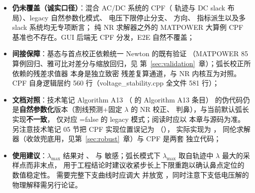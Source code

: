 \begin{itemize}
\begin{enumerate}
        \end{enumerate}
        同批新增的高级求解器回归还有
         与
        （ctest 目标 \texttt{test\_homotopy\_continuation} 与
        \texttt{test\_newton\_krylov}，），第~\ref{sec:robust}~章
        所述同伦求解器与 Newton--Krylov 的“无专项回归”状态同步解除；
  \item \textbf{仍未覆盖（诚实口径）}：混合 AC/DC 系统的 CPF（
        轨迹与 DC slack 布局）、legacy 自然参数化模式、
         电压下限停止分支、 方向、
         指标派生以及多 slack 系统均无专项断言；
        纯 NR 求解器之外的 MATPOWER 大算例 CPF 基准也不存在。GUI 后端无
        CPF 分发，E2E 自然不覆盖；
  \item \textbf{间接保障}：基态与首点校正依赖统一 Newton 的既有验证
        （MATPOWER 85 算例回归、雅可比对差分与缩放回归，见
        第~\ref{sec:validation}~章）；弧长校正所依赖的残差求值器
         本身是独立致密
        残差复算通道，与 NR 内核互为对照。CPF 自身逻辑层约
        560 行（voltage\_stability.cpp 全文件 581 行）；
  \item \textbf{文档对照}：技术笔记 Algorithm A13
        （ 的 Algorithm A13 条目）
        的伪代码仍是\textbf{自然参数化}版本（割线预测+固定 $\lambda$ 的
        NR 校正、 判鼻），与当前默认弧长实现\textbf{不一致}，
        仅对应 =false 的 legacy 模式；阅读时应以
        本章与源码为准。另注意技术笔记 05 节把 CPF 实现位置误记为
        （），
        实际实现为 ，
        同伦求解器（收敛兜底用，见第~\ref{sec:robust}~章）与 CPF 是两套
        独立代码；
  \item \textbf{使用建议}：$\lambda_{\max}$ 结果对 、
         与  敏感；弧长模式下
        $\lambda_{\max}$ 取自轨迹中 $\lambda$ 最大的采样点而非末点，
        用于工程结论时建议收紧步长上下限重跑以确认鼻点定位的数值稳定性。
        需要完整下支曲线时应调大  并放宽
        ，同时注意下支低电压解的物理解释需另行论证。
\end{itemize}
